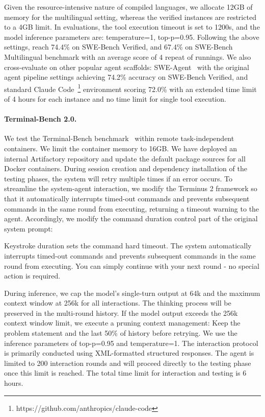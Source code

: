 Given the resource-intensive nature of compiled languages, we allocate 12GB of memory for the multilingual setting, whereas the verified instances are restricted to a 4GB limit. In evaluations, the tool execution timeout is set to 1200s, and the model inference parameters are: temperature=1, top-p=0.95. Following the above settings, \ourmodel reach 74.4\% on SWE-Bench Verified, and 67.4\% on SWE-Bench Multilingual benchmark with an average score of 4 repeat of runnings. We also cross-evaluate \ourmodel on other popular agent scaffolds: SWE-Agent~\cite{yang2024swe} with the original agent pipeline settings achieving 74.2\% accuracy on SWE-Bench Verified, and standard Claude Code~\footnote{https://github.com/anthropics/claude-code} environment scoring 72.0\% with an extended time limit of 4 hours for each instance and no time limit for single tool execution.

\paragraph{Terminal-Bench 2.0.}

We test the Terminal-Bench benchmark~\cite{terminalbench2025} within remote task-independent containers. We limit the container memory to 16GB. We have deployed an internal Artifactory repository and update the default package sources for all Docker containers. During session creation and dependency installation of the testing phases, the system will retry multiple times if an error occurs. To streamline the system-agent interaction, we modify the Terminus 2 framework so that it automatically interrupts timed-out commands and prevents subsequent commands in the same round from executing, returning a timeout warning to the agent. Accordingly, we modify the command duration control part of the original system prompt:

\begin{MyBox}{}

Keystroke duration sets the command hard timeout. The system automatically interrupts timed-out commands and prevents subsequent commands in the same round from executing. You can simply continue with your next round - no special action is required.
\end{MyBox}

During inference, we cap the model's single-turn output at 64k and the maximum context window at 256k for all interactions. The thinking process will be preserved in the multi-round history. If the model output exceeds the 256k context window limit, we execute a pruning context management: Keep the problem statement and the last 50\% of history before retrying. We use the inference parameters of top-p=0.95 and temperature=1. The interaction protocol is primarily conducted using XML-formatted structured responses. The agent is limited to 200 interaction rounds and will proceed directly to the testing phase once this limit is reached. The total time limit for interaction and testing is 6 hours.

